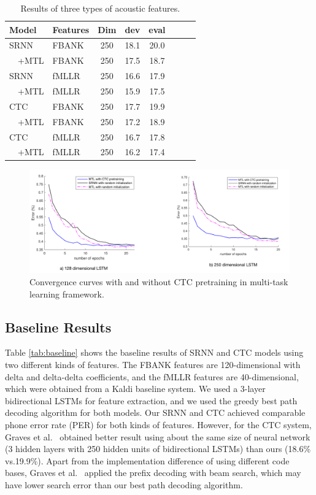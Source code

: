 \documentclass[a4paper]{article}
\begin{document}
\begin{table}
 \centering \small
\caption{Results of three types of acoustic features. }
\label{tab:mtl}
\begin{tabular}{ll|cccccc}
\hline

\hline
Model & Features   & Dim & dev  & eval \\ \hline
SRNN & FBANK & 250 & 18.1 & 20.0 \\
$\quad$+MTL & FBANK& 250 &17.5& 18.7 \\
SRNN & fMLLR & 250 & 16.6 & 17.9 \\
$\quad$+MTL  & fMLLR & 250 & 15.9 & 17.5 \\ \hline
CTC & FBANK & 250 & 17.7 & 19.9\\ 
$\quad$+MTL & FBANK& 250 &  17.2 & 18.9 \\
CTC & fMLLR & 250 & 16.7 & 17.8 \\ 
$\quad$+MTL   & fMLLR & 250 & 16.2 & 17.4 \\ \hline

\hline
\end{tabular}
\vskip-2mm
\end{table}

\begin{figure}[t]
\small
\centerline{\includegraphics[width=1\textwidth]{ictc}} \vskip -2mm
\caption{Convergence curves with and without CTC pretraining in multi-task learning framework.}  
\label{fig:ctc-pretrain}
\vskip -2mm
\end{figure}

\subsection{Baseline Results}

Table \ref{tab:baseline} shows the baseline results of SRNN and CTC models using two different kinds of features. The FBANK features are 120-dimensional with delta and delta-delta coefficients, and the fMLLR features are 40-dimensional, which were obtained from a Kaldi baseline system. We used a 3-layer bidirectional LSTMs for feature extraction, and we used the greedy best path decoding algorithm for both models. Our SRNN and CTC achieved comparable phone error rate (PER) for both kinds of features. However, for the CTC system, Graves et al.~\cite{graves2013speech} obtained better result using about the same size of neural network (3 hidden layers with 250 hidden units of bidirectional LSTMs) than ours (18.6\% vs.19.9\%). Apart from the implementation difference of using different code bases, Graves et al.~\cite{graves2013speech} applied the prefix decoding with beam search, which may have lower search error than our best path decoding algorithm. 
\end{document}

